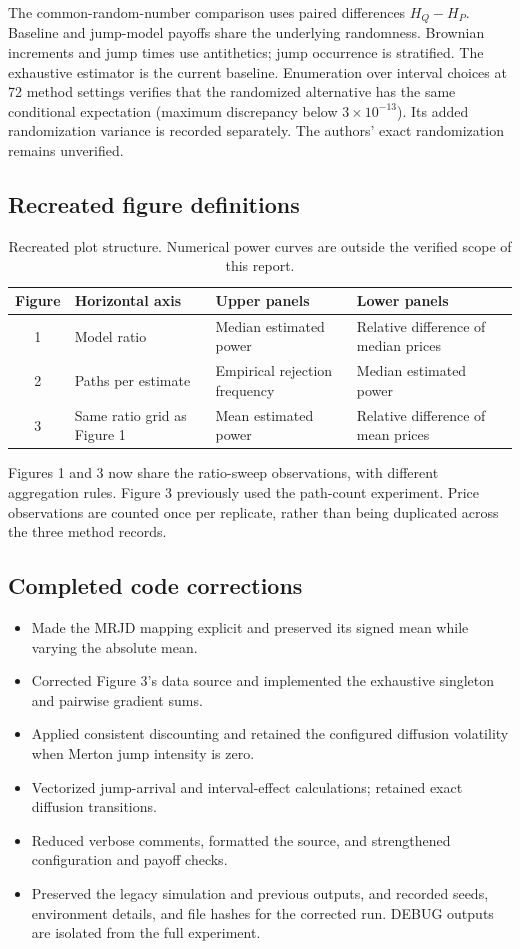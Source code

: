 \documentclass[11pt,a4paper]{article}
\begin{document}
The common-random-number comparison uses paired differences
$H_Q-H_P$. Baseline and jump-model payoffs share the underlying
randomness. Brownian increments and jump times use antithetics;
jump occurrence is stratified. The exhaustive estimator is the current
baseline. Enumeration over interval choices at 72 method settings verifies
that the randomized alternative has the same conditional expectation
(maximum discrepancy below $3\times10^{-13}$). Its added randomization
variance is recorded separately. The authors' exact randomization remains
unverified.

\subsection{Recreated figure definitions}
\begin{table}[h]
\centering\small
\begin{tabular}{@{}cp{30mm}p{39mm}p{49mm}@{}}
\toprule
Figure & Horizontal axis & Upper panels & Lower panels\\
\midrule
1 & Model ratio & Median estimated power & Relative difference of median prices\\
2 & Paths per estimate & Empirical rejection frequency & Median estimated power\\
3 & Same ratio grid as Figure 1 & Mean estimated power & Relative difference of mean prices\\
\bottomrule
\end{tabular}
\caption{Recreated plot structure. Numerical power curves are outside
the verified scope of this report.}
\end{table}

Figures 1 and 3 now share the ratio-sweep observations, with different
aggregation rules. Figure 3 previously used the path-count experiment.
Price observations are counted once per replicate, rather than being
duplicated across the three method records.

\subsection{Completed code corrections}
\begin{itemize}
\item Made the MRJD mapping explicit and preserved its signed mean while varying the absolute mean.
\item Corrected Figure 3's data source and implemented the exhaustive
singleton and pairwise gradient sums.
\item Applied consistent discounting and retained the configured
diffusion volatility when Merton jump intensity is zero.
\item Vectorized jump-arrival and interval-effect calculations;
retained exact diffusion transitions.
\item Reduced verbose comments, formatted the source, and strengthened
configuration and payoff checks.
\item Preserved the legacy simulation and previous outputs, and recorded
seeds, environment details, and file hashes for the corrected run. DEBUG outputs are isolated from
the full experiment.
\end{itemize}
\end{document}
